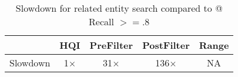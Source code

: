 
\begin{table}[!t]
\small
\centering
	\caption{Slowdown for related entity search compared to \hybridindex @ Recall $>= .8$}\label{tab:end_to_end}
\begin{tabular}{lcccc}
                             & \textbf{HQI} & \textbf{PreFilter} & \textbf{PostFilter} & \textbf{Range} \\ \hline
\multicolumn{1}{c}{Slowdown} & 1$\times$    & 31$\times$         & 136$\times$         & NA            
\end{tabular}
\end{table}